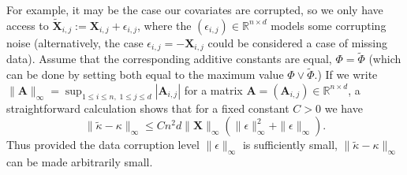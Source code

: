 \documentclass{aptpub}
\begin{document}
 
 \begin{remark}
 For example, it may be the case our covariates are corrupted, so we only have access to $\widetilde{\mathbf X}_{i,j}:=\mathbf X_{i,j}+\epsilon_{i,j}$, where the $(\epsilon_{i,j})\in\mathbb{R}^{n\times d}$ models some corrupting noise (alternatively, the case $\epsilon_{i,j}=-\mathbf X_{i,j}$ could be considered a case of missing data).
 Assume that the corresponding additive constants are equal, $\Phi=\widetilde \Phi$ (which can be done by setting both equal to the maximum value $\Phi \vee \widetilde \Phi$.)
 If we write $\|\mathbf A\|_\infty = \sup_{1\leq i\leq n,\; 1\leq j\leq d}|\mathbf A_{i,j}|$ for a matrix $\mathbf A= (\mathbf{A}_{i,j})\in \mathbb{R}^{n\times d}$, a straightforward calculation shows that for a fixed constant $C>0$ we have \[\|\widetilde\kappa -\kappa\|_\infty \le C n^2 d\|\mathbf X\|_\infty (\|\epsilon\|_\infty^2+\|\epsilon\|_\infty).\] Thus provided the data corruption level $\|\epsilon\|_\infty$ is sufficiently small,  $\|\widetilde\kappa -\kappa\|_\infty$ can be made arbitrarily small.
 \end{remark}
 
\end{document}
